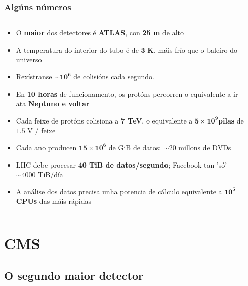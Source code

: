\documentclass{beamer}
\begin{document}
\begin{frame}[default, backgroundpicture=gpx/dvd_stack.pdf]
  \frametitle{Algúns números}
  \begin{columns}
  \begin{column}{0.65\textwidth}
    \begin{itemize}
      \item O \textbf{maior} dos detectores é \textbf{ATLAS}, con \textbf{25
      m} de alto
      \item A temperatura do interior do tubo é de $\mathbf{3}$ \textbf{K}, máis
      frío que o baleiro do universo
      \item Rexístranse $\mathbf{\sim 10^6}$ de colisións cada segundo.
      \item En \textbf{10 horas} de funcionamento, os protóns percorren o
      equivalente a ir ata \textbf{Neptuno e voltar}
      \item Cada feixe de protóns colisiona a \textbf{7 TeV}, o equivalente a 
      $\mathbf{5\times 10^9} $\textbf{pilas} de $1.5$ V / feixe
      \item Cada ano producen $\mathbf{15\times 10^6}$ de GiB de datos: 
      $\sim 20$ millons de DVDs
      \item LHC debe procesar \textbf{40 TiB de datos/segundo}; Facebook
      tan 'só' $\sim 4000$ TiB/día
      \item A análise dos datos precisa unha potencia de cálculo
      equivalente a $\mathbf{10^5}$ \textbf{CPUs} das máis rápidas
    \end{itemize} 
  \end{column}
  \begin{column}{0.3\textwidth}
  \end{column}
  \end{columns}

\end{frame}



\section{CMS}



\subsection{O segundo maior detector}
\end{document}
